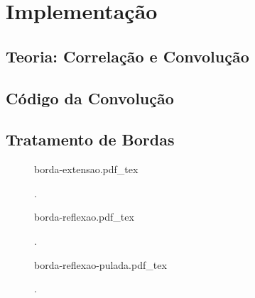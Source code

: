 \section{Implementação} \label{sec:impl}

\subsection{Teoria: Correlação e Convolução}

    

\subsection{Código da Convolução}

    

\subsection{Tratamento de Bordas}

    \begin{figure}[H]
        \centering
        \def\svgwidth{4cm}
        {borda-extensao.pdf_tex}

        \caption{.}
        \label{fig:borda-extensao}
    \end{figure}

    \begin{figure}[H]
        \centering
        \def\svgwidth{4cm}
        {borda-reflexao.pdf_tex}

        \caption{.}
        \label{fig:borda-reflexao}
    \end{figure}

    \begin{figure}[H]
        \centering
        \def\svgwidth{4cm}
        {borda-reflexao-pulada.pdf_tex}

        \caption{.}
        \label{fig:borda-reflexao-pulada}
    \end{figure}
